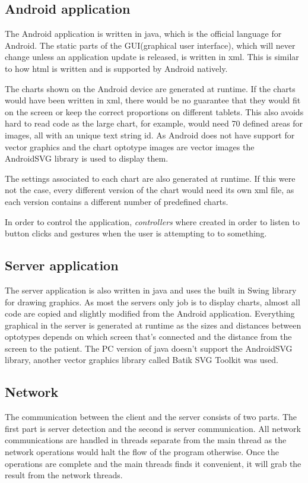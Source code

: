 \documentclass[12pt,a4paper,notitlepage]{report}
\begin{document}


\subsection{Android application}
The Android application is written in java, which is the official language for Android. The static parts of the GUI(graphical user interface), which will never change unless an application update is released, is written in xml. This is similar to how html is written and is supported by Android natively.

The charts shown on the Android device are generated at runtime. If the charts would have been written in xml, there would be no guarantee that they would fit on the screen or keep the correct proportions on different tablets. This also avoids hard to read code as the large chart, for example, would need 70 defined areas for images, all with an unique text string id. As Android does not have support for vector graphics and the chart optotype images are vector images the AndroidSVG \cite{AndroidSVG} library is used to display them.

The settings associated to each chart are also generated at runtime. If this were not the case, every different version of the chart would need its own xml file, as each version contains a different number of predefined charts.

In order to control the application, \textit{controllers} where created in order to listen to button clicks and gestures when the user is attempting to to something.

\subsection{Server application}
The server application is also written in java and uses the built in Swing library for drawing graphics. As most the servers only job is to display charts, almost all code are copied and slightly modified from the Android application. Everything graphical in the server is generated at runtime as the sizes and distances between optotypes depends on which screen that's connected and the distance from the screen to the patient. The PC version of java doesn't support the AndroidSVG library, another vector graphics library called Batik SVG Toolkit \cite{Batik} was used.

\subsection{Network}
The communication between the client and the server consists of two parts. The first part is server detection and the second is server communication. All network communications are handled in threads separate from the main thread as the network operations would halt the flow of the program otherwise. Once the operations are complete and the main threads finds it convenient, it will grab the result from the network threads.
\end{document}
